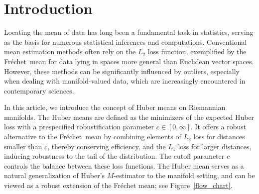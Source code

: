 \documentclass[preprint]{imsart}
\def\Frechet{Fr\'{e}chet}
\theoremstyle{plain}
\theoremstyle{remark}
\begin{document}
\begin{frontmatter}
\begin{keyword}[class=MSC]
\end{keyword}

\begin{keyword}
\end{keyword}

\end{frontmatter}
\tableofcontents

\section{Introduction}

Locating the mean of data has long been a fundamental task in statistics, serving as the basis for numerous statistical inferences and computations. Conventional mean estimation methods often rely on the $L_2$ loss function, exemplified by the \Frechet\ mean for data lying in spaces more general than Euclidean vector spaces. However, these methods can be significantly influenced by outliers, especially when dealing with manifold-valued data, which are increasingly encountered in contemporary sciences.

In this article, we introduce the concept of Huber means on Riemannian manifolds. The Huber means are defined as the minimizers of the expected Huber loss with a prespecified robustification parameter $c\in [0, \infty]$. It offers a robust alternative to the \Frechet\ mean by combining elements of $L_2$ loss for distances smaller than $c$, thereby conserving efficiency, and the $L_1$ loss for larger distances, inducing robustness to the tail of the distribution. The cutoff parameter $c$ controls the balance between these loss functions. 
The Huber mean serves as a natural generalization of Huber's $M$-estimator \citep{huber1964robust} to the manifold setting, and can be viewed as a robust extension of the Fr\'{e}chet mean; see Figure~\ref{flow_chart}. 
\end{document}
